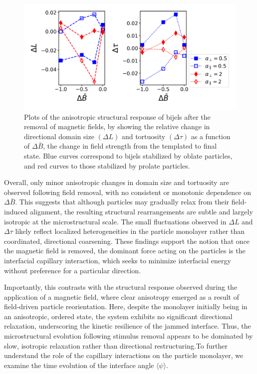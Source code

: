 \begin{figure} 
\centering 
\includegraphics[scale = 0.6]{../figures/results/paper2/domain_size_aniso-field_down.png} 
\caption{Plots of the anisotropic structural response of bijels after the removal of 
         magnetic fields, by showing the relative change in directional domain size \((\Delta L)\) and tortuosity \((\Delta \tau)\) 
         as a function of \(\Delta \bar{B}\), the change in field strength from the templated to final state. Blue curves correspond 
         to bijels stabilized by oblate particles, and red curves to those stabilized by prolate particles.} 
\label{fig:domain_size_aniso-field_down} 
\end{figure}

Overall, only minor anisotropic changes in domain size and tortuosity are observed following field removal, with no consistent 
or monotonic dependence on \(\Delta \bar{B}\). This suggests that although particles may gradually relax from their field-induced 
alignment, the resulting structural rearrangements are subtle and largely isotropic at the microstructural scale. The small 
fluctuations observed in \(\Delta L\) and \(\Delta \tau\) likely reflect localized heterogeneities in the particle monolayer 
rather than coordinated, directional coarsening. These findings support the notion that once the magnetic field is removed, 
the dominant force acting on the particles is the interfacial capillary interaction, which seeks to minimize interfacial 
energy without preference for a particular direction.

Importantly, this contrasts with the structural response observed during the application of a magnetic field, where clear 
anisotropy emerged as a result of field-driven particle reorientation. Here, despite the monolayer initially being in an 
anisotropic, ordered state, the system exhibits no significant directional relaxation, underscoring the kinetic resilience 
of the jammed interface. Thus, the microstructural evolution following stimulus removal appears to be dominated by slow, 
isotropic relaxation rather than directional restructuring.To further understand the role of the capillary interactions on the 
particle monolayer, we examine the time evolution of the interface angle \(\langle \psi \rangle\). 

